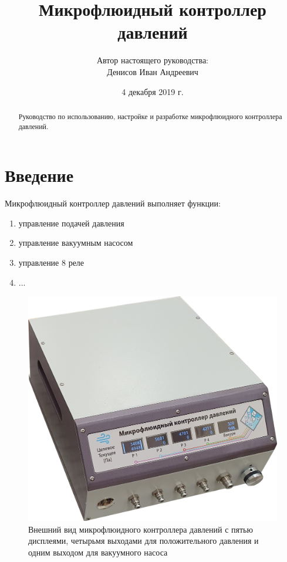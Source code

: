 \documentclass[twoside, 12pt, a4paper]{refart}
\title{Микрофлюидный контроллер давлений}
\author{
Автор настоящего руководства: \\
Денисов Иван Андреевич \\
}
\date{4 декабря 2019 г.}
\begin{document}
\maketitle

\begin{abstract}
Руководство по использованию, настройке и разработке микрофлюидного контроллера давлений.
\end{abstract}

\tableofcontents

\newpage



\section{Введение}
\label{intro}

Микрофлюидный контроллер давлений выполняет функции:
\begin{enumerate}

\item управление подачей давления
    
\item управление вакуумным насосом

\item управление 8 реле

\item ...
        
\end{enumerate}

\begin{figure}[h!b]
	\begin{center}
	\includegraphics[width=\textwidth]{imgs/device.jpg}
	\caption{Внешний вид микрофлюидного контроллера давлений с пятью дисплеями, четырьмя выходами для положительного давления и одним выходом для вакуумного насоса}
	\label{fig:device}
	\end{center}
\end{figure}
\end{document}

